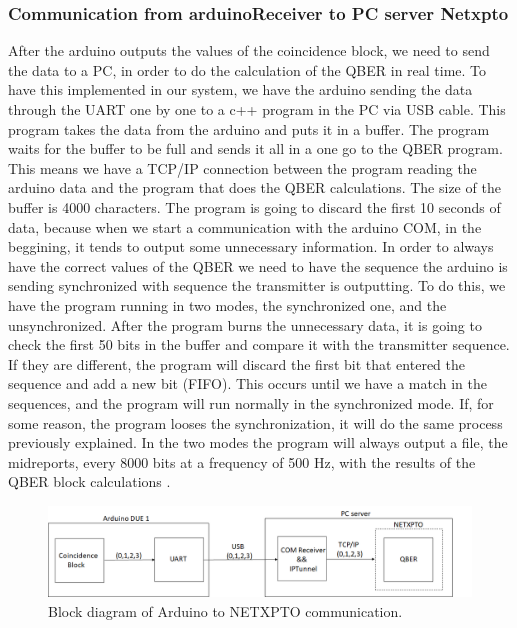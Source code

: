 \begin{refsection}
	\subsubsection{Communication from arduinoReceiver to PC server Netxpto}
	After the arduino outputs the values of the coincidence block, we need to send the data to a PC, in order to do the calculation of the QBER in real time. To have this implemented in our system, we have the arduino sending the data through the UART one by one to a c++ program in the PC via USB cable. This program takes the data from the arduino and puts it in a buffer. The program waits for the buffer to be full and sends it all in a one go to the QBER program. This means we have a TCP/IP connection between the program reading the arduino data and the program that does the QBER calculations. The size of the buffer is 4000 characters. The program is going to discard the first 10 seconds of data, because when we start a communication with the arduino COM, in the beggining, it tends to output some unnecessary information. In order to always have the correct values of the QBER we need to have the sequence the arduino is sending synchronized with sequence the transmitter is outputting. To do this, we have the program running in two modes, the synchronized one, and the unsynchronized. After the program burns the unnecessary data, it is going to check the first 50 bits in the buffer and compare it with the transmitter sequence. If they are different, the program will discard the first bit that entered the sequence and add a new bit (FIFO). This occurs until we have a match in the sequences, and the program will run normally in the synchronized mode. If, for some reason, the program looses the synchronization, it will do the same process previously explained. In the two modes the program will always output a file, the midreports, every 8000 bits at a frequency of 500 Hz, with the results of the QBER block calculations
	.
		\begin{figure}[H]
		\centering
		\includegraphics[width=1.2\linewidth]{./sdf/arduino_quantum_rx/figures/PC.png}
		\caption{Block diagram of Arduino to NETXPTO communication.}
		\label{fig:netxpto}
	\end{figure}
	

\end{refsection}
